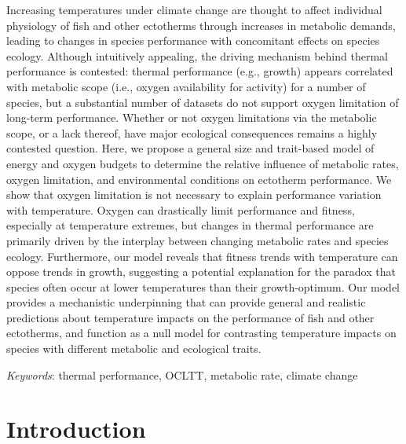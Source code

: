 \documentclass[11pt]{article}\usepackage[]{graphicx}\usepackage[]{color,soul}
\begin{document}
Increasing temperatures under climate change are thought to affect individual physiology of fish and other ectotherms through increases in metabolic demands, leading to changes in species performance with concomitant effects on species ecology. Although intuitively appealing, the driving mechanism behind thermal performance is contested: thermal performance (e.g., growth) appears correlated with metabolic scope (i.e., oxygen availability for activity) for a number of species, but a substantial number of datasets do not support oxygen limitation of long-term performance. Whether or not oxygen limitations via the metabolic scope, or a lack thereof, have major ecological consequences remains a highly contested question. Here, we propose a general size and trait-based model of energy and oxygen budgets to determine the relative influence of metabolic rates, oxygen limitation, and environmental conditions on ectotherm performance. We show that oxygen limitation is not necessary to explain performance variation with temperature. Oxygen can drastically limit performance and fitness, especially at temperature extremes, but changes in thermal performance are primarily driven by the interplay between changing metabolic rates and species ecology. Furthermore, our model reveals that fitness trends with temperature can oppose trends in growth, suggesting a potential explanation for the paradox that species often occur at lower temperatures than their growth-optimum. Our model provides a mechanistic underpinning that can provide general and realistic predictions about temperature impacts on the performance of fish and other ectotherms, and function as a null model for contrasting temperature impacts on species with different metabolic and ecological traits.



\textit{Keywords}: thermal performance, OCLTT, metabolic rate, climate change


\newpage

\section*{Introduction}
\end{document}

